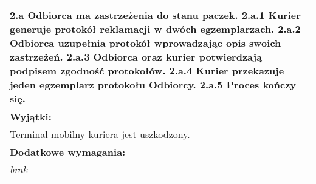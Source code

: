 \begin{center}
\begin{longtable}[h]{|p{1.6cm}|p{13.5cm}|}
\multicolumn{2}{|p{15.1cm}|}{
2.a Odbiorca ma zastrzeżenia do stanu paczek. \newline
2.a.1 Kurier generuje protokół reklamacji w dwóch egzemplarzach. \newline
2.a.2 Odbiorca uzupełnia protokół wprowadzając opis swoich zastrzeżeń. \newline
2.a.3 Odbiorca oraz kurier potwierdzają podpisem zgodność protokołów. \newline
2.a.4 Kurier przekazuje jeden egzemplarz protokołu Odbiorcy. \newline
2.a.5 Proces kończy się.
} \\ \hline
\multicolumn{2}{|p{15.1cm}|}{\textbf{Wyjątki:}} \\
\multicolumn{2}{|p{15.1cm}|}{
Terminal mobilny kuriera jest uszkodzony.
} \\ \hline
\multicolumn{2}{|p{15.1cm}|}{\textbf{Dodatkowe wymagania:}} \\
\multicolumn{2}{|p{15.1cm}|}{
\textit{brak}
} \\
\hline
\end{longtable}
\end{center}

